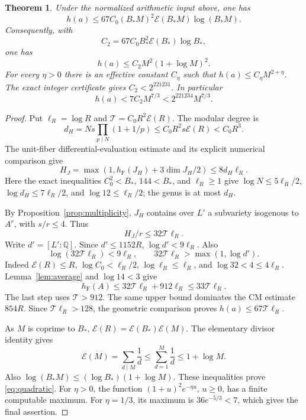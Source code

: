 \documentclass[11pt,a4paper]{article}
\newtheorem{theorem}{Theorem}[section]
\newcommand{\Q}{\mathbb Q}
\newcommand{\hF}{h_{\mathrm F}}
\begin{document}
\begin{theorem}\label{thm:height}
Under the normalized arithmetic input above, one has
\[
 h(a)\le67C_0(B_*M)^2\mathcal E(B_*M)\log(B_*M).
\]
Consequently, with
\[
               C_2=67C_0B_*^2\mathcal E(B_*)\log B_*,
\]
one has
\begin{equation}\label{eq:quadratic}
                    h(a)\le C_2 M^2(1+\log M)^2.
\end{equation}
For every \(\eta>0\) there is an effective constant \(C_\eta\)
such that \(h(a)\le C_\eta M^{2+\eta}\).
The exact integer certificate gives $C_2<2^{221231}$. In particular
\[
                         h(a)<7C_2 M^{7/3}<2^{221234}M^{7/3}.
\]
\end{theorem}
\begin{proof}
Put \(\ell_R=\log R\) and \(\mathcal T=C_0R^2\mathcal E(R)\).
The modular degree is
\[
 d_H=N s\prod_{p\mid N}(1+1/p)
       \le C_0R^2s\mathcal E(R)<C_0R^3.
\]
The unit-fiber differential-evaluation estimate
\cite[Section~3]{Characters} and its explicit numerical comparison give
\[
 H_J=\max(1,\hF(J_H)+3\dim J_H/2)\le8d_H\ell_R.
\]
Here the exact inequalities \(C_0^2<B_*\), \(144<B_*\), and
\(\ell_R\ge1\) give
\(\log N\le5\ell_R/2\), \(\log d_H\le7\ell_R/2\), and
\(\log12\le\ell_R/2\); the genus is at most \(d_H\).

By Proposition~\ref{prop:multiplicity}, \(J_H\) contains over \(L'\)
a subvariety isogenous to \(A^r\), with \(s/r\le4\). Thus
\[
                            H_J/r\le32\mathcal T\ell_R.
\]
Write \(d'=[L':\Q]\). Since \(d'\le1152R\),
\(\log d'<9\ell_R\). Also
\[
 \log(32\mathcal T\ell_R)<9\ell_R,\qquad
 32\mathcal T\ell_R>\max(1,\log d').
\]
Indeed \(\mathcal E(R)\le R\), \(\log C_0<\ell_R/2\),
\(\log\ell_R\le\ell_R\), and \(\log32<4\le4\ell_R\).
Lemma~\ref{lem:average} and \(\log14<3\) give
\[
 \hF(A)\le32\mathcal T\ell_R+912\ell_R
                    \le33\mathcal T\ell_R.
\]
The last step uses \(\mathcal T>912\). The same upper bound
dominates the CM estimate \(854R\). Since
\(\mathcal T\ell_R>128\), the geometric comparison proves
\(h(a)\le67\mathcal T\ell_R\).

As \(M\) is coprime to \(B_*\),
\(\mathcal E(R)=\mathcal E(B_*)\mathcal E(M)\).
The elementary divisor identity gives
\[
 \mathcal E(M)=\sum_{d\mid M}\frac1d
                       \le\sum_{d=1}^M\frac1d\le1+\log M.
\]
Also \(\log(B_*M)\le(\log B_*)(1+\log M)\).
These inequalities prove \eqref{eq:quadratic}.
For \(\eta>0\), the function
\((1+u)^2e^{-\eta u}\), \(u\ge0\), has a finite computable
maximum. For \(\eta=1/3\), its maximum is \(36e^{-5/3}<7\),
which gives the final assertion.
\end{proof}
\end{document}
